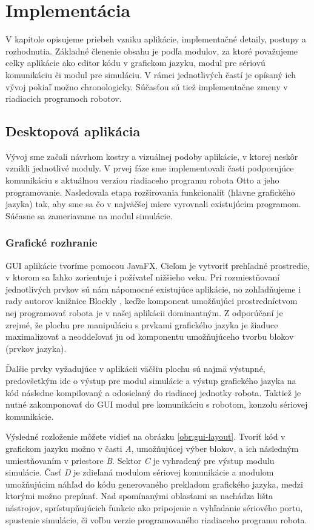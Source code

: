 \chapter{Implementácia}
\label{kap:implementacia}

V kapitole opisujeme priebeh vzniku aplikácie, implementačné detaily, postupy a rozhodnutia. Základné členenie obsahu je podľa modulov, za ktoré považujeme celky aplikácie ako editor kódu v grafickom jazyku, modul pre sériovú komunikáciu či modul pre simuláciu. V rámci jednotlivých častí je opísaný ich vývoj pokiaľ možno chronologicky. Súčasťou sú tiež implementačne zmeny v riadiacich programoch robotov.

\section{Desktopová aplikácia}
Vývoj sme začali návrhom kostry a vizuálnej podoby aplikácie, v ktorej neskôr vznikli jednotlivé moduly. V prvej fáze sme implementovali časti podporujúce komunikáciu s aktuálnou verziou riadiaceho programu robota Otto a jeho programovanie. Nasledovala etapa rozširovania funkcionalít (hlavne grafického jazyka) tak, aby sme sa čo v najväčšej miere vyrovnali existujúcim programom. Súčasne sa zameriavame na modul simulácie.

\subsection{Grafické rozhranie}
GUI aplikácie tvoríme pomocou JavaFX. Cieľom je vytvoriť prehľadné prostredie, v ktorom sa ľahko zorientuje i požívateľ nižšieho veku. Pri rozmiestňovaní jednotlivých prvkov sú nám nápomocné existujúce aplikácie, no zohľadňujeme i rady autorov knižnice Blockly \cite{blocklyBestPractices}, keďže komponent umožňujúci prostredníctvom nej programovať robota je v našej aplikácii dominantným. Z odporúčaní je zrejmé, že plochu pre manipuláciu s prvkami grafického jazyka je žiaduce maximalizovať a neoddeľovať ju od komponentu umožňujúceho tvorbu blokov (prvkov jazyka).

Ďalšie prvky vyžadujúce v aplikácii väčšiu plochu sú najmä výstupné, predovšetkým ide o výstup pre modul simulácie a výstup  grafického jazyka na kód následne kompilovaný a odosielaný do riadiacej jednotky robota. Taktiež je nutné zakomponovať do GUI modul pre komunikáciu s robotom, konzolu sériovej komunikácie.

Výsledné rozloženie môžete vidieť na obrázku \ref{obr:gui-layout}. Tvoriť kód v grafickom jazyku možno v časti \textit{A}, umožňujúcej výber blokov, a ich následným umiestňovaním v priestore \textit{B}. Sektor \textit{C} je vyhradený pre výstup modulu simulácie. Časť \textit{D} je zdieľaná modulom sériovej komunikácie a modulom umožňujúcim náhľad do kódu generovaného prekladom grafického jazyka, medzi ktorými možno prepínať. Nad spomínanými oblasťami sa nachádza lišta nástrojov, sprístupňujúcich funkcie ako pripojenie a vyhľadanie sériového portu, spustenie simulácie, či voľbu verzie programovaného riadiaceho programu robota.

